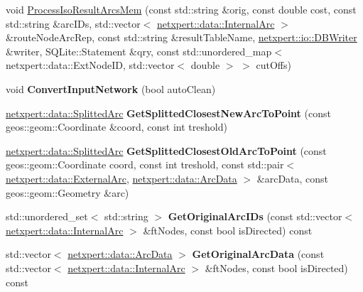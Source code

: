 \begin{DoxyCompactItemize}
void \hyperlink{classnetxpert_1_1Network_a77ee8b423d95c5138c09b6154a51f1d7}{Process\+Iso\+Result\+Arcs\+Mem} (const std\+::string \&orig, const double cost, const std\+::string \&arc\+I\+Ds, std\+::vector$<$ \hyperlink{structnetxpert_1_1data_1_1InternalArc}{netxpert\+::data\+::\+Internal\+Arc} $>$ \&route\+Node\+Arc\+Rep, const std\+::string \&result\+Table\+Name, \hyperlink{classnetxpert_1_1io_1_1DBWriter}{netxpert\+::io\+::\+D\+B\+Writer} \&writer, S\+Q\+Lite\+::\+Statement \&qry, const std\+::unordered\+\_\+map$<$ netxpert\+::data\+::\+Ext\+Node\+ID, std\+::vector$<$ double $>$ $>$ cut\+Offs)
\item 
void {\bfseries Convert\+Input\+Network} (bool auto\+Clean)\hypertarget{classnetxpert_1_1Network_a42eea4b294bece0ac632ea4365e14660}{}\label{classnetxpert_1_1Network_a42eea4b294bece0ac632ea4365e14660}

\item 
\hyperlink{structnetxpert_1_1data_1_1SplittedArc}{netxpert\+::data\+::\+Splitted\+Arc} {\bfseries Get\+Splitted\+Closest\+New\+Arc\+To\+Point} (const geos\+::geom\+::\+Coordinate \&coord, const int treshold)\hypertarget{classnetxpert_1_1Network_a530476d9c7ae4027c0e408d78338fd7c}{}\label{classnetxpert_1_1Network_a530476d9c7ae4027c0e408d78338fd7c}

\item 
\hyperlink{structnetxpert_1_1data_1_1SplittedArc}{netxpert\+::data\+::\+Splitted\+Arc} {\bfseries Get\+Splitted\+Closest\+Old\+Arc\+To\+Point} (const geos\+::geom\+::\+Coordinate coord, const int treshold, const std\+::pair$<$ \hyperlink{structnetxpert_1_1data_1_1ExternalArc}{netxpert\+::data\+::\+External\+Arc}, \hyperlink{structnetxpert_1_1data_1_1ArcData}{netxpert\+::data\+::\+Arc\+Data} $>$ \&arc\+Data, const geos\+::geom\+::\+Geometry \&arc)\hypertarget{classnetxpert_1_1Network_ab5d1c2924054732bc0b3c6bed9e9fde1}{}\label{classnetxpert_1_1Network_ab5d1c2924054732bc0b3c6bed9e9fde1}

\item 
std\+::unordered\+\_\+set$<$ std\+::string $>$ {\bfseries Get\+Original\+Arc\+I\+Ds} (const std\+::vector$<$ \hyperlink{structnetxpert_1_1data_1_1InternalArc}{netxpert\+::data\+::\+Internal\+Arc} $>$ \&ft\+Nodes, const bool is\+Directed) const \hypertarget{classnetxpert_1_1Network_ad8680e8d5fea98953d488343207fc30c}{}\label{classnetxpert_1_1Network_ad8680e8d5fea98953d488343207fc30c}

\item 
std\+::vector$<$ \hyperlink{structnetxpert_1_1data_1_1ArcData}{netxpert\+::data\+::\+Arc\+Data} $>$ {\bfseries Get\+Original\+Arc\+Data} (const std\+::vector$<$ \hyperlink{structnetxpert_1_1data_1_1InternalArc}{netxpert\+::data\+::\+Internal\+Arc} $>$ \&ft\+Nodes, const bool is\+Directed) const \hypertarget{classnetxpert_1_1Network_aa5e9e3a5454831b589c68b7ab629939c}{}\label{classnetxpert_1_1Network_aa5e9e3a5454831b589c68b7ab629939c}


\end{DoxyCompactItemize}
